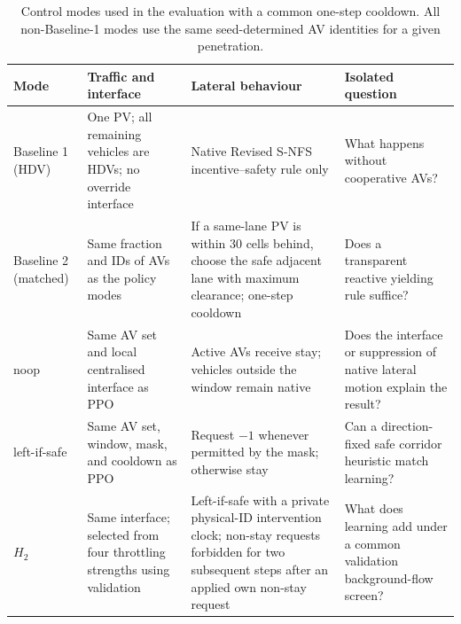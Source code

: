 \begin{table}[t]
\centering
\caption{Control modes used in the evaluation with a common one-step cooldown. All non-Baseline-1 modes use the same seed-determined AV identities for a given penetration.}
\label{tab:controls}
\begingroup
\small
\setlength{\tabcolsep}{4pt}
\begin{tabular}{@{}P{0.17\textwidth}P{0.24\textwidth}P{0.34\textwidth}P{0.18\textwidth}@{}}
\toprule
Mode & Traffic and interface & Lateral behaviour & Isolated question \\
\midrule
Baseline 1 (HDV) & One PV; all remaining vehicles are HDVs; no override interface & Native Revised S-NFS incentive--safety rule only & What happens without cooperative AVs? \\
Baseline 2 (matched) & Same fraction and IDs of AVs as the policy modes & If a same-lane PV is within 30 cells behind, choose the safe adjacent lane with maximum clearance; one-step cooldown & Does a transparent reactive yielding rule suffice? \\
noop & Same AV set and local centralised interface as PPO & Active AVs receive stay; vehicles outside the window remain native & Does the interface or suppression of native lateral motion explain the result? \\
left-if-safe & Same AV set, window, mask, and cooldown as PPO & Request $-1$ whenever permitted by the mask; otherwise stay & Can a direction-fixed safe corridor heuristic match learning? \\
$H_2$ & Same interface; selected from four throttling strengths using validation & Left-if-safe with a private physical-ID intervention clock; non-stay requests forbidden for two subsequent steps after an applied own non-stay request & What does learning add under a common validation background-flow screen? \\
\bottomrule
\end{tabular}
\endgroup
\end{table}
